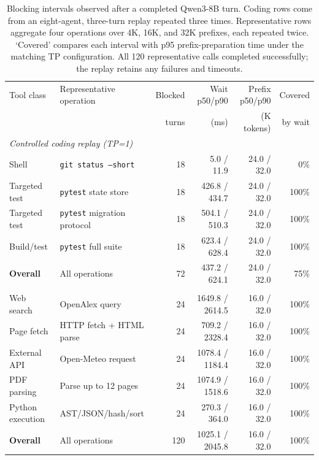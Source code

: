 \begin{table}[t]
\centering
\small
\caption{Blocking intervals observed after a completed Qwen3-8B turn. Coding rows come from an eight-agent, three-turn replay repeated three times. Representative rows aggregate four operations over 4K, 16K, and 32K prefixes, each repeated twice. `Covered' compares each interval with p95 prefix-preparation time under the matching TP configuration. All 120 representative calls completed successfully; the replay retains any failures and timeouts.}
\label{tab:tool-gaps}
\begin{tabular}{llrrrr}
\toprule
Tool class & Representative operation & Blocked & Wait p50/p90 & Prefix p50/p90 & Covered \\
 & & turns & (ms) & (K tokens) & by wait \\
\midrule
\multicolumn{6}{l}{\textit{Controlled coding replay (TP=1)}} \\
Shell & \texttt{git status --short} & 18 & 5.0 / 11.9 & 24.0 / 32.0 & 0\% \\
Targeted test & \texttt{pytest} state store & 18 & 426.8 / 434.7 & 24.0 / 32.0 & 100\% \\
Targeted test & \texttt{pytest} migration protocol & 18 & 504.1 / 510.3 & 24.0 / 32.0 & 100\% \\
Build/test & \texttt{pytest} full suite & 18 & 623.4 / 628.4 & 24.0 / 32.0 & 100\% \\
\textbf{Overall} & All operations & 72 & 437.2 / 624.1 & 24.0 / 32.0 & 75\% \\
\addlinespace[2pt]
\multicolumn{6}{l}{\textit{Representative blocking operations (TP=2)}} \\
Web search & OpenAlex query & 24 & 1649.8 / 2614.5 & 16.0 / 32.0 & 100\% \\
Page fetch & HTTP fetch + HTML parse & 24 & 709.2 / 2328.4 & 16.0 / 32.0 & 100\% \\
External API & Open-Meteo request & 24 & 1078.4 / 1184.4 & 16.0 / 32.0 & 100\% \\
PDF parsing & Parse up to 12 pages & 24 & 1074.9 / 1518.6 & 16.0 / 32.0 & 100\% \\
Python execution & AST/JSON/hash/sort & 24 & 270.3 / 364.0 & 16.0 / 32.0 & 100\% \\
\textbf{Overall} & All operations & 120 & 1025.1 / 2045.8 & 16.0 / 32.0 & 100\% \\
\bottomrule
\end{tabular}
\end{table}
